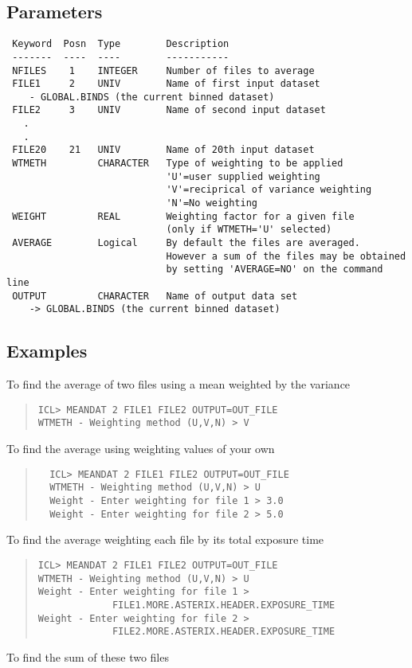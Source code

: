 \documentclass{book}
\renewcommand{\_}{{\tt\char'137}}     %
\begin{document}
\subsection{Parameters}
\begin{verbatim}
 Keyword  Posn  Type        Description
 -------  ----  ----        -----------
 NFILES    1    INTEGER     Number of files to average
 FILE1     2    UNIV        Name of first input dataset
    - GLOBAL.BINDS (the current binned dataset)
 FILE2     3    UNIV        Name of second input dataset
   .
   .
 FILE20    21   UNIV        Name of 20th input dataset
 WTMETH         CHARACTER   Type of weighting to be applied
                            'U'=user supplied weighting
                            'V'=reciprical of variance weighting
                            'N'=No weighting
 WEIGHT         REAL        Weighting factor for a given file
                            (only if WTMETH='U' selected)
 AVERAGE        Logical     By default the files are averaged.
                            However a sum of the files may be obtained
                            by setting 'AVERAGE=NO' on the command line
 OUTPUT         CHARACTER   Name of output data set
    -> GLOBAL.BINDS (the current binned dataset)

\end{verbatim}\subsection{Examples}
To find the average of two files using a mean weighted by the variance

\begin{quote}\begin{verbatim}
ICL> MEANDAT 2 FILE1 FILE2 OUTPUT=OUT_FILE
WTMETH - Weighting method (U,V,N) > V
\end{verbatim}\end{quote}
To find the average using weighting values of your own

\begin{quote}\begin{verbatim}
  ICL> MEANDAT 2 FILE1 FILE2 OUTPUT=OUT_FILE
  WTMETH - Weighting method (U,V,N) > U
  Weight - Enter weighting for file 1 > 3.0
  Weight - Enter weighting for file 2 > 5.0
\end{verbatim}\end{quote}
To find the average weighting each file by its total exposure time
\begin{quote}\begin{verbatim}
ICL> MEANDAT 2 FILE1 FILE2 OUTPUT=OUT_FILE
WTMETH - Weighting method (U,V,N) > U
Weight - Enter weighting for file 1 >
             FILE1.MORE.ASTERIX.HEADER.EXPOSURE_TIME
Weight - Enter weighting for file 2 >
             FILE2.MORE.ASTERIX.HEADER.EXPOSURE_TIME
\end{verbatim}\end{quote}
To find the sum of these two files
\end{document}
